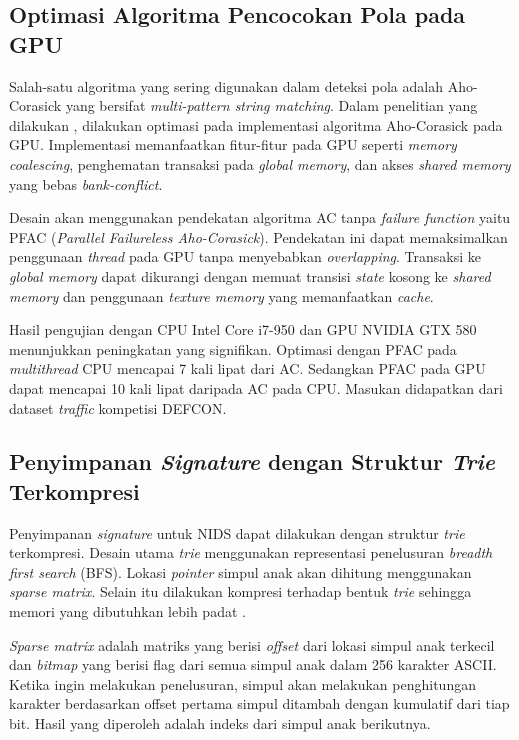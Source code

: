   \subsection{Optimasi Algoritma Pencocokan Pola pada GPU}

    Salah-satu algoritma yang sering digunakan dalam deteksi pola adalah Aho-Corasick yang bersifat \emph{multi-pattern string matching}. Dalam penelitian yang dilakukan \cite{lin2013}, dilakukan optimasi pada implementasi algoritma Aho-Corasick pada GPU. Implementasi memanfaatkan fitur-fitur pada GPU seperti \emph{memory coalescing}, penghematan transaksi pada \emph{global memory}, dan akses \emph{shared memory} yang bebas \emph{bank-conflict}.

    Desain akan menggunakan pendekatan algoritma AC tanpa \emph{failure function} yaitu PFAC (\emph{Parallel Failureless Aho-Corasick}). Pendekatan ini dapat memaksimalkan penggunaan \emph{thread} pada GPU tanpa menyebabkan \emph{overlapping}. Transaksi ke \emph{global memory} dapat dikurangi dengan memuat transisi \emph{state} kosong ke \emph{shared memory} dan penggunaan \emph{texture memory} yang memanfaatkan \emph{cache}.

    Hasil pengujian dengan CPU Intel Core i7-950 dan GPU NVIDIA GTX 580 menunjukkan peningkatan yang signifikan. Optimasi dengan PFAC pada \emph{multithread} CPU mencapai 7 kali lipat dari AC. Sedangkan PFAC pada GPU dapat mencapai 10 kali lipat daripada AC pada CPU. Masukan didapatkan dari dataset \emph{traffic} kompetisi DEFCON.

  \subsection{Penyimpanan \emph{Signature} dengan Struktur \emph{Trie} Terkompresi}

    Penyimpanan \emph{signature} untuk NIDS dapat dilakukan dengan struktur \emph{trie} terkompresi. Desain utama \emph{trie} menggunakan representasi penelusuran \emph{breadth first search} (BFS). Lokasi \emph{pointer} simpul anak akan dihitung menggunakan \emph{sparse matrix}. Selain itu dilakukan kompresi terhadap bentuk \emph{trie} sehingga memori yang dibutuhkan lebih padat \citep{bellekens2014}.

    \emph{Sparse matrix} adalah matriks yang berisi \emph{offset} dari lokasi simpul anak terkecil dan \emph{bitmap} yang berisi flag dari semua simpul anak dalam 256 karakter ASCII. Ketika ingin melakukan penelusuran, simpul akan melakukan penghitungan karakter berdasarkan offset pertama simpul ditambah dengan kumulatif dari tiap bit. Hasil yang diperoleh adalah indeks dari simpul anak berikutnya.

